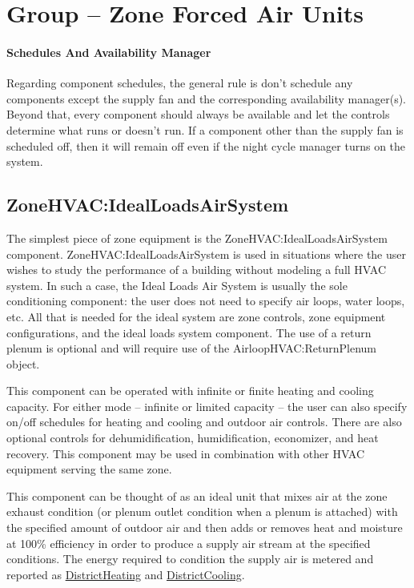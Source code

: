 \section{Group -- Zone Forced Air Units}\label{group-zone-forced-air-units}

\paragraph{Schedules And Availability Manager}\label{schedules-and-availability-manager}
Regarding component schedules, the general rule is don't schedule any components except the supply fan and the corresponding availability manager(s). Beyond that, every component should always be available and let the controls determine what runs or doesn't run. If a component other than the supply fan is scheduled off, then it will remain off even if the night cycle manager turns on the system.

\subsection{ZoneHVAC:IdealLoadsAirSystem}\label{zonehvacidealloadsairsystem}

The simplest piece of zone equipment is the ZoneHVAC:IdealLoadsAirSystem component. ZoneHVAC:IdealLoadsAirSystem is used in situations where the user wishes to study the performance of a building without modeling a full HVAC system. In such a case, the Ideal Loads Air System is usually the sole conditioning component: the user does not need to specify air loops, water loops, etc. All that is needed for the ideal system are zone controls, zone equipment configurations, and the ideal loads system component. The use of a return plenum is optional and will require use of the AirloopHVAC:ReturnPlenum object.

This component can be operated with infinite or finite heating and cooling capacity. For either mode -- infinite or limited capacity -- the user can also specify on/off schedules for heating and cooling and outdoor air controls. There are also optional controls for dehumidification, humidification, economizer, and heat recovery. This component may be used in combination with other HVAC equipment serving the same zone.

This component can be thought of as an ideal unit that mixes air at the zone exhaust condition (or plenum outlet condition when a plenum is attached) with the specified amount of outdoor air and then adds or removes heat and moisture at 100\% efficiency in order to produce a supply air stream at the specified conditions. The energy required to condition the supply air is metered and reported as \hyperref[districtheating]{DistrictHeating} and \hyperref[districtcooling]{DistrictCooling}.

